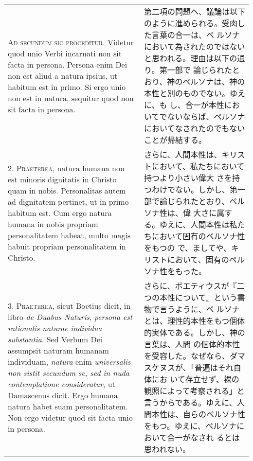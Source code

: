 \documentclass[10pt]{jsarticle} %
\begin{document}
\begin{longtable}{p{21em}p{21em}}




{\Huge A}{\scshape d secundum sic proceditur}. Videtur quod unio Verbi
incarnati non sit facta in persona. Persona enim Dei non est aliud a
natura ipsius, ut habitum est in primo. Si ergo unio non est in
natura, sequitur quod non sit facta in persona.


&


第二項の問題へ、議論は以下のように進められる。受肉した言葉の合一は、ペ
ルソナにおいて為されたのではないと思われる。理由は以下の通り。第一部で
論じられたとおり、神のペルソナは、神の本性と別のものでない。ゆえに、も
し、合一が本性においてでないならば、ペルソナにおいてなされたのでもない
ことが帰結する。

\\



2. {\scshape Praeterea}, natura humana non est minoris dignitatis in
Christo quam in nobis. Personalitas autem ad dignitatem pertinet, ut
in primo habitum est. Cum ergo natura humana in nobis propriam
personalitatem habeat, multo magis habuit propriam personalitatem in
Christo.


&


さらに、人間本性は、キリストにおいて、私たちにおいて持つより小さい偉大
さを持つわけでない。しかし、第一部で論じられたとおり、ペルソナ性は、偉
大さに属する。ゆえに、人間本性は私たちにおいて固有のペルソナ性をもつの
で、ましてや、キリストにおいて、固有のペルソナ性をもった。

\\



3. {\scshape Praeterea}, sicut Boetius dicit, in libro {\itshape de
Duabus Naturis}, {\itshape persona est rationalis naturae individua
substantia}. Sed Verbum Dei assumpsit naturam humanam individuam,
{\itshape natura} enim {\itshape universalis non sistit secundum se,
sed in nuda contemplatione consideratur}, ut Damascenus dicit. Ergo
humana natura habet suam personalitatem. Non ergo videtur quod sit
facta unio in persona.


&

さらに、ボエティウスが『二つの本性について』という書物で言うように、ペ
ルソナとは、理性的本性をもつ個体的実体である。しかし、神の言葉は、人間
の個体的本性を受容した。なぜなら、ダマスケヌスが、「普遍はそれ自体にお
いて存立せず、裸の観照によって考察される」と言うからである。ゆえに、人
間本性は、自らのペルソナ性をもつ。ゆえに、ペルソナにおいて合一がなされ
るとは思われない。



\end{longtable}
\end{document}
